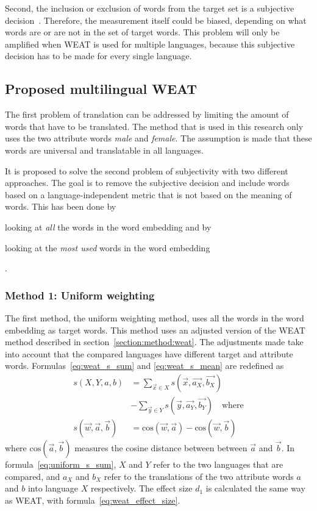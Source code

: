 Second, the inclusion or exclusion of words from
the target set is a subjective decision~\parencite{nissim_fair_is_better_2020}. Therefore,
the measurement itself could be biased, depending on what words are or are not in the set
of target words. This problem will only be amplified when WEAT is used for multiple
languages, because this subjective decision has to be made for every single language.

\subsection{Proposed multilingual WEAT}
The first problem of translation can be addressed by limiting the amount of words that
have to be
translated. The method that is used in this research only uses the two attribute words 
\textit{male} and \textit{female}. The assumption is made that these words are universal
and translatable in all languages. 

It is proposed to solve the second problem of subjectivity with two different approaches.
The goal is to
remove the subjective decision and include words based on a language-independent metric
that is not based on the meaning of words. This has been done by
\begin{enumerate*}[label={(\arabic*)}]
    \item looking at \emph{all} the words in the word embedding and by
    \item looking at the \emph{most used} words in the word embedding
\end{enumerate*}.

\subsubsection{Method 1: Uniform weighting}
\label{method:1}
The first method, the uniform weighting method, uses all the words in the word embedding as target words. 
This method uses an adjusted version of the WEAT method described in
section~\ref{section:method:weat}. The adjustments made take into account that
the compared languages have different target and attribute words.
Formulas~\eqref{eq:weat_s_sum} and
\eqref{eq:weat_s_mean} are redefined as 
\begin{align} \label{eq:uniform_s_sum}
    s(X,Y,a,b) &= \displaystyle\sum_{\vec{x} \in X} s(\vec{x},\vec{a_X},\vec{b_X})
    \nonumber \\
               &- \displaystyle\sum_{\vec{y} \in Y} s(\vec{y},\vec{a_Y},\vec{b_Y})
    \quad\text{where}\\
\label{eq:uniform_s_mean}
    s(\vec{w},\vec{a},\vec{b}) &= \text{cos}(\vec{w}, \vec{a}) - \text{cos}(\vec{w}, \vec{b})
\end{align}
where $\text{cos}(\vec{a}, \vec{b})$ measures the cosine distance between between
$\vec{a}$ and $\vec{b}$. 
In formula~\eqref{eq:uniform_s_sum}, $X$ and $Y$ refer to the two languages that are
compared, and $a_X$ and $b_X$ refer to the translations of the
two attribute words $a$ and $b$ into language $X$ respectively. 
The effect size $d_1$ is calculated the same way as WEAT, with
formula~\eqref{eq:weat_effect_size}.

